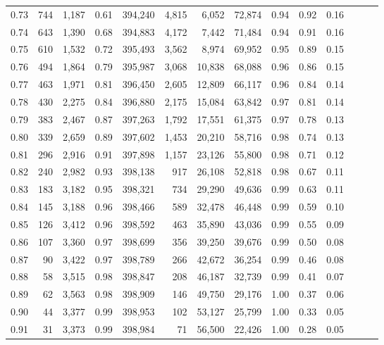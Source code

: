 \begin{tabular}{rrrrrrrrrrrrrr}
0.73 &    744 &  1,187 &  0.61 &  394,240 &    4,815 &   6,052 &  72,874 &  0.94 &  0.92 &      0.16 \\
0.74 &    643 &  1,390 &  0.68 &  394,883 &    4,172 &   7,442 &  71,484 &  0.94 &  0.91 &      0.16 \\
0.75 &    610 &  1,532 &  0.72 &  395,493 &    3,562 &   8,974 &  69,952 &  0.95 &  0.89 &      0.15 \\
0.76 &    494 &  1,864 &  0.79 &  395,987 &    3,068 &  10,838 &  68,088 &  0.96 &  0.86 &      0.15 \\
0.77 &    463 &  1,971 &  0.81 &  396,450 &    2,605 &  12,809 &  66,117 &  0.96 &  0.84 &      0.14 \\
0.78 &    430 &  2,275 &  0.84 &  396,880 &    2,175 &  15,084 &  63,842 &  0.97 &  0.81 &      0.14 \\
0.79 &    383 &  2,467 &  0.87 &  397,263 &    1,792 &  17,551 &  61,375 &  0.97 &  0.78 &      0.13 \\
0.80 &    339 &  2,659 &  0.89 &  397,602 &    1,453 &  20,210 &  58,716 &  0.98 &  0.74 &      0.13 \\
0.81 &    296 &  2,916 &  0.91 &  397,898 &    1,157 &  23,126 &  55,800 &  0.98 &  0.71 &      0.12 \\
0.82 &    240 &  2,982 &  0.93 &  398,138 &      917 &  26,108 &  52,818 &  0.98 &  0.67 &      0.11 \\
0.83 &    183 &  3,182 &  0.95 &  398,321 &      734 &  29,290 &  49,636 &  0.99 &  0.63 &      0.11 \\
0.84 &    145 &  3,188 &  0.96 &  398,466 &      589 &  32,478 &  46,448 &  0.99 &  0.59 &      0.10 \\
0.85 &    126 &  3,412 &  0.96 &  398,592 &      463 &  35,890 &  43,036 &  0.99 &  0.55 &      0.09 \\
0.86 &    107 &  3,360 &  0.97 &  398,699 &      356 &  39,250 &  39,676 &  0.99 &  0.50 &      0.08 \\
0.87 &     90 &  3,422 &  0.97 &  398,789 &      266 &  42,672 &  36,254 &  0.99 &  0.46 &      0.08 \\
0.88 &     58 &  3,515 &  0.98 &  398,847 &      208 &  46,187 &  32,739 &  0.99 &  0.41 &      0.07 \\
0.89 &     62 &  3,563 &  0.98 &  398,909 &      146 &  49,750 &  29,176 &  1.00 &  0.37 &      0.06 \\
0.90 &     44 &  3,377 &  0.99 &  398,953 &      102 &  53,127 &  25,799 &  1.00 &  0.33 &      0.05 \\
0.91 &     31 &  3,373 &  0.99 &  398,984 &       71 &  56,500 &  22,426 &  1.00 &  0.28 &      0.05 \\

\end{tabular}
